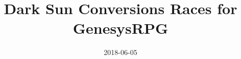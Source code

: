 \documentclass[a4paper, openright, 8pt]{report}
\title{Dark Sun Conversions Races for GenesysRPG}
\date{2018-06-05}
\begin{document}
\renewcommand{\constRacesShowImage}{false}

\begin{multicols*}{2}










\end{multicols*}
\end{document}
